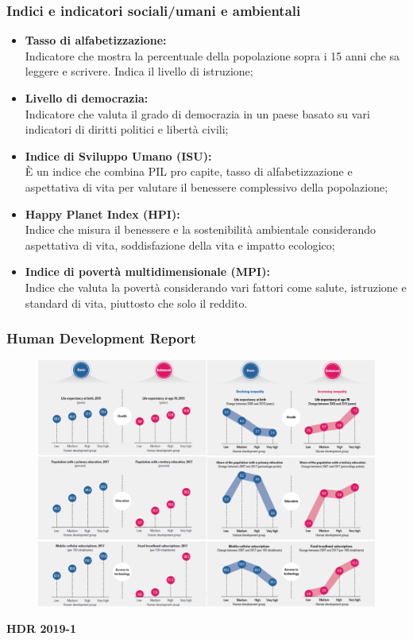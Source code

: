 \documentclass{article}
\begin{document}
\subsubsection{Indici e indicatori sociali/umani e ambientali}
\begin{itemize}
    \item \textbf{Tasso di alfabetizzazione:}\\
        Indicatore che mostra la percentuale della popolazione sopra i 15 anni che sa leggere
        e scrivere. Indica il livello di istruzione;
    \item \textbf{Livello di democrazia:}\\
        Indicatore che valuta il grado di democrazia in un paese basato su vari indicatori
        di diritti politici e libertà civili;
    \item \textbf{Indice di Sviluppo Umano (ISU):}\\
    È un indice che combina PIL pro capite, tasso di alfabetizzazione e aspettativa di
    vita per valutare il benessere complessivo della popolazione;
    \item \textbf{Happy Planet Index (HPI):}\\
        Indice che misura il benessere e la sostenibilità ambientale considerando aspettativa
        di vita, soddisfazione della vita e impatto ecologico;
    \item \textbf{Indice di povertà multidimensionale (MPI):}\\
        Indice che valuta la povertà considerando vari fattori come salute, istruzione e 
        standard di vita, piuttosto che solo il reddito.
\end{itemize}
\pagebreak

\subsubsection{Human Development Report}
\setlength{\intextsep}{0pt}%
\begin{figure}
    \includegraphics[width=.5\textwidth]{media/hdr2019_1.png}
    \vspace{-1cm}
\end{figure}
\textbf{HDR 2019-1}
\end{document}
